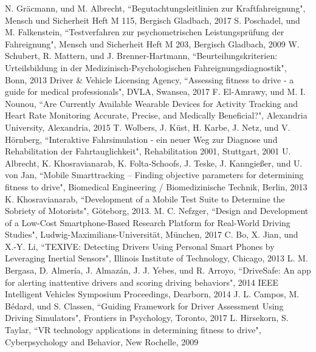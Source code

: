 \documentclass[conference]{IEEEtran}
\begin{document}
\begin{thebibliography}{00}

 N. Gräcmann, und M. Albrecht, ``Begutachtungsleitlinien zur Kraftfahreignung", Mensch und Sicherheit Heft M 115, Bergisch Gladbach, 2017
 S. Poschadel, und M. Falkenstein, ``Testverfahren zur psychometrischen Leistungsprüfung der Fahreignung", Mensch und Sicherheit Heft M 203, Bergisch Gladbach, 2009
 W. Schubert, R. Mattern, und J. Brenner-Hartmann, ``Beurteilungskriterien: Urteilsbildung in der Medizinisch-Psychologischen Fahreignungsdiagnostik", Bonn, 2013
 Driver \& Vehicle Licensing Agency, ``Assessing fitness to drive - a guide for medical professionals", DVLA, Swansea, 2017
 F. El-Amrawy, und M. I. Nounou, ``Are Currently Available Wearable Devices for Activity Tracking and Heart Rate Monitoring Accurate, Precise, and Medically Beneficial?", Alexandria University, Alexandria, 2015
 T. Wolbers, J. Küst, H. Karbe, J. Netz, und V. Hörnberg, ``Interaktive Fahrsimulation - ein neuer Weg zur Diagnose und Rehabilitation der Fahrtauglichkeit", Rehabilitation 2001, Stuttgart, 2001
 U. Albrecht, K. Khosravianarab, K. Folta-Schoofs, J. Teske, J. Kanngießer, und U. von Jan, ``Mobile Smarttracking – Finding objective parameters for determining fitness to drive", Biomedical Engineering / Biomedizinische Technik, Berlin, 2013
K. Khosravianarab, ``Development of a Mobile Test Suite to Determine the Sobriety of Motorists", Göteborg, 2013.
 M. C. Nefzger, ``Design and Development of a Low-Cost Smartphone-Based Research Platform for Real-World Driving Studies", Ludwig-Maximilians-Universität, München, 2017
 C. Bo, X. Jian, und X.-Y. Li, ``TEXIVE: Detecting Drivers Using Personal Smart Phones
by Leveraging Inertial Sensors",  Illinois Institute of Technology, Chicago, 2013
 L. M. Bergasa, D. Almería, J. Almazán, J. J. Yebes, und R. Arroyo, ``DriveSafe: An app for alerting inattentive drivers and scoring driving behaviors", 2014 IEEE Intelligent Vehicles Symposium Proceedings, Dearborn, 2014
J. L. Campos, M. Bédard, und S. Classen, ``Guiding Framework for Driver Assessment Using Driving Simulators", Frontiers in Psychology, Toronto, 2017
L. Hirsekorn, S. Taylar, ``VR technology applications in determining fitness to drive", Cyberpsychology and Behavior, New Rochelle, 2009

\end{thebibliography}
\end{document}
